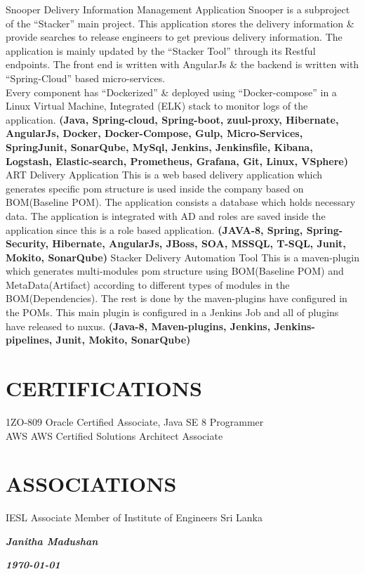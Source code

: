 \documentclass[]{cv-class}
\begin{document}
\newpage
\begin{aside}
\end{aside}


\begin{entrylist}
    \entry
        {}
	    {Snooper}
        {Delivery Information Management Application}
	    {
	        Snooper is a subproject of the “Stacker” main project. This application stores the delivery information \& provide searches to release engineers to get previous delivery information.
	        The application is mainly updated by the “Stacker Tool” through its Restful endpoints.
	        The front end is written with AngularJs \& the backend is written with “Spring-Cloud” based micro-services.
	        \\
	        Every component has “Dockerized” \& deployed using “Docker-compose” in a Linux Virtual Machine, Integrated (ELK) stack to monitor logs of the application.
	        \textbf{(Java, Spring-cloud, Spring-boot, zuul-proxy, Hibernate, AngularJs, Docker, Docker-Compose, Gulp, Micro-Services, SpringJunit, SonarQube, MySql, Jenkins,
	        Jenkinsfile, Kibana, Logstash, Elastic-search, Prometheus, Grafana, Git, Linux, VSphere)}
	    }
	    \\
    \entry
        {}
	    {ART}
        {Delivery Application}
        {This is a web based delivery application which generates specific pom structure is used inside the company based on BOM(Baseline POM). The application consists a database which holds necessary data. The application is integrated with AD and roles are saved inside the application since this is a role based application. \textbf{(JAVA-8, Spring, Spring-Security, Hibernate, AngularJs, JBoss, SOA, MSSQL, T-SQL, Junit, Mokito, SonarQube)}}
    \entry
        {}
    	{Stacker}
        {Delivery Automation Tool}
    	{This is a maven-plugin which generates multi-modules pom structure using BOM(Baseline POM) and MetaData(Artifact) according to different types of 			modules in the BOM(Dependencies). The rest is done by the maven-plugins have configured in the POMs. This main plugin is configured in a Jenkins Job 		and all of plugins have released to nuxus. \textbf{(Java-8, Maven-plugins, Jenkins, Jenkins-pipelines, Junit, Mokito, SonarQube)}}
\end{entrylist}


\section{CERTIFICATIONS}
\begin{entrylist}
\entry
    {}
	{1ZO-809}
    {}
	{Oracle Certified Associate, Java SE 8 Programmer}
\\
\entry
    {}
	{AWS}
    {}
	{AWS Certified Solutions Architect Associate}
\end{entrylist}


\section{ASSOCIATIONS}
\begin{entrylist}
\entry
    {}
	{IESL}    
    {}
	{Associate Member of Institute of Engineers Sri Lanka}
\end{entrylist}

\begin{flushright}
\emph{\textbf{Janitha Madushan}}
\end{flushright}
\begin{flushright}
\emph{\textbf{\today}}
\end{flushright}
\end{document}
